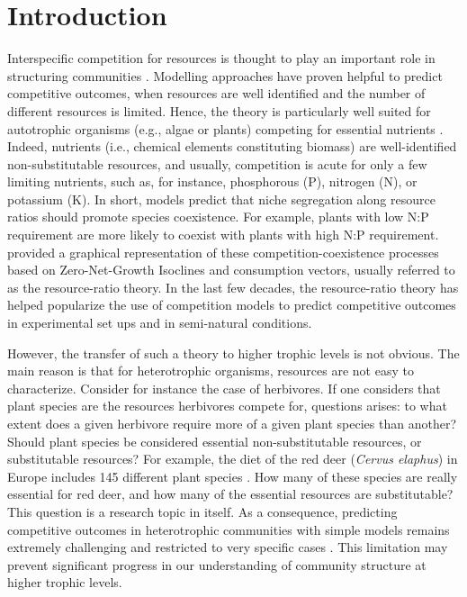 \documentclass[12pt]{article}
\begin{document}
\section*{Introduction}
Interspecific competition for resources is thought to play an important role in structuring communities \citep{Gause1934,Tilman1987}. Modelling approaches have proven helpful to predict competitive outcomes, when resources are well identified and the number of different resources is limited. Hence, the theory is particularly well suited for autotrophic organisms (e.g., algae or plants) competing for essential nutrients \citep{Tilman1982}. Indeed, nutrients (i.e., chemical elements constituting biomass) are well-identified non-substitutable resources, and usually, competition is acute for only a few limiting nutrients, such as, for instance, phosphorous (P), nitrogen (N), or potassium (K). In short, models  predict that niche  segregation  along  resource ratios should promote species coexistence. For example,  plants with low N:P requirement are more likely to coexist  with plants with high N:P requirement. \cite{Tilman1980} provided a graphical representation of these competition-coexistence processes based on Zero-Net-Growth Isoclines and consumption vectors, usually referred  to as the resource-ratio theory. In the last few decades, the resource-ratio theory has helped  popularize the use of competition models to predict competitive outcomes in experimental set ups and in  semi-natural conditions.\par 
However, the transfer of such a theory to higher trophic levels is not obvious. The main reason is that for heterotrophic organisms, resources are not easy to characterize. Consider for instance the case of herbivores. 
If one considers that plant species are the resources herbivores compete for, questions arises: to what extent does a given herbivore require more of a given plant species than another? Should plant species be considered essential non-substitutable resources, or  substitutable resources? 
For example, the diet of the red deer (\textit{Cervus elaphus}) in Europe includes 145 different plant species \citep{Gebert2001}. 
How many of these species are really essential for red deer, and how many of the essential resources are substitutable? This question is a research topic in itself. As a consequence, predicting  competitive outcomes  in  heterotrophic communities with simple models remains extremely challenging and restricted to very specific cases \citep{Murray2008}. This limitation may prevent significant progress in our understanding of community structure at higher trophic levels. \par 
\end{document}
